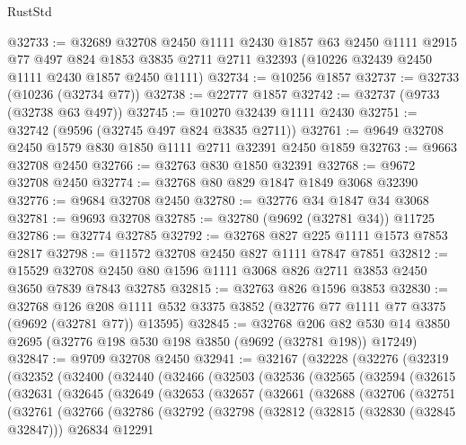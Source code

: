 \begin{lexlean}{RustStd}
\begin{coremodule}
@32733 := @32689
    @32708
    @2450
    @1111
    @2430
    @1857
    @63
    @2450
    @1111
    @2915
    @77
    @497
    @824
    @1853
    @3835
    @2711
    @2711
    @32393
    (@10226 @32439 @2450 @1111 @2430 @1857 @2450 @1111)
@32734 := @10256 @1857
@32737 := @32733 (@10236 (@32734 @77))
@32738 := @22777 @1857
@32742 := @32737 (@9733 (@32738 @63 @497))
@32745 := @10270 @32439 @1111 @2430
@32751 := @32742 (@9596 (@32745 @497 @824 @3835 @2711))
@32761 := @9649 @32708 @2450 @1579 @830 @1850 @1111 @2711 @32391 @2450 @1859
@32763 := @9663 @32708 @2450
@32766 := @32763 @830 @1850 @32391
@32768 := @9672 @32708 @2450
@32774 := @32768 @80 @829 @1847 @1849 @3068 @32390
@32776 := @9684 @32708 @2450
@32780 := @32776 @34 @1847 @34 @3068
@32781 := @9693 @32708
@32785 := @32780 (@9692 (@32781 @34)) @11725
@32786 := @32774 @32785
@32792 := @32768 @827 @225 @1111 @1573 @7853 @2817
@32798 := @11572 @32708 @2450 @827 @1111 @7847 @7851
@32812 := @15529 @32708 @2450 @80 @1596 @1111 @3068 @826 @2711 @3853 @2450 @3650 @7839 @7843 @32785
@32815 := @32763 @826 @1596 @3853
@32830 := @32768
    @126
    @208
    @1111
    @532
    @3375
    @3852
    (@32776 @77 @1111 @77 @3375 (@9692 (@32781 @77)) @13595)
@32845 := @32768
    @206
    @82
    @530
    @14
    @3850
    @2695
    (@32776 @198 @530 @198 @3850 (@9692 (@32781 @198)) @17249)
@32847 := @9709 @32708 @2450
@32941 := @32167
    (@32228
      (@32276
        (@32319
          (@32352
            (@32400
              (@32440
                (@32466
                  (@32503
                    (@32536
                      (@32565
                        (@32594
                          (@32615
                            (@32631
                              (@32645
                                (@32649
                                  (@32653
                                    (@32657
                                      (@32661
                                        (@32688
                                          (@32706
                                            (@32751
                                              (@32761
                                                (@32766
                                                  (@32786
                                                    (@32792
                                                      (@32798
                                                        (@32812
                                                          (@32815 (@32830 (@32845 @32847)))
                                                          @26834
                                                          @12291

\end{coremodule}
\end{lexlean}
